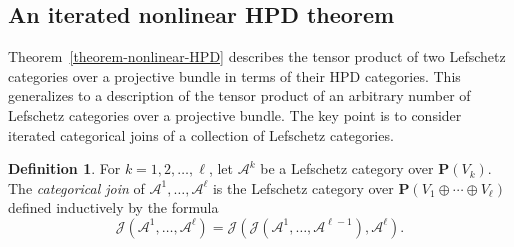 \documentclass[11pt, reqno]{amsart}
\numberwithin{equation}{section}
\theoremstyle{plain}
\theoremstyle{definition}
\newtheorem{definition}[theorem]{Definition}
\newcommand{\cA}{\mathcal{A}}
\newcommand{\cJ}{\mathcal{J}}
\newcommand{\bP}{\mathbf{P}}
\begin{document}
\subsection{An iterated nonlinear HPD theorem} 
\label{subsection-iterated-nonlinear-HPD-theorem}   

Theorem~\ref{theorem-nonlinear-HPD} describes the tensor product of two Lefschetz categories 
over a projective bundle in terms of their HPD categories. 
This generalizes to a description of the tensor product of an arbitrary 
number of Lefschetz categories over a projective bundle. 
The key point is to consider iterated categorical joins of a collection of Lefschetz categories. 

\begin{definition}
For $k=1,2, \dots, \ell$, let $\cA^k$ be a Lefschetz category over $\bP(V_k)$. 
The \emph{categorical join} of $\cA^1, \dots, \cA^{\ell}$ is the Lefschetz 
category over $\bP(V_1 \oplus \cdots \oplus V_{\ell})$ defined inductively by the formula 
\begin{equation*}
\cJ(\cA^1, \dots, \cA^{\ell}) = \cJ(\cJ(\cA^1, \dots, \cA^{\ell-1}), \cA^\ell). 
\end{equation*}
\end{definition}
\end{document}
